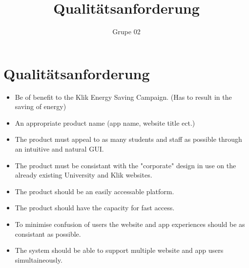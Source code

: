 \documentclass[10pt,a4paper]{article}
\author{Grupe 02}
\title{Qualitätsanforderung}
\begin{document}
\section*{Qualit{\"a}tsanforderung}

\begin{itemize}
\item
Be of benefit to the Klik Energy Saving Campaign. (Has to result in the saving of energy)
\item
An appropriate product name (app name, website title ect.)
\item
The product must appeal to as many students and staff as possible through an intuitive and natural GUI.
\item
The product must be consistant with the "corporate" design in use on the already existing University and Klik websites.
\item
The product should be an easily accessable platform.
\item
The product should have the capacity for fast access.
\item
To minimise confusion of users the website and app experiences should be as consistant as possible.
\item
The system should be able to support multiple website and app users simultaineously.
\end{itemize}
\end{document}
